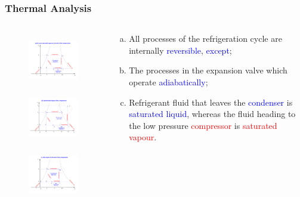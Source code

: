 \documentclass[10pt,compress]{beamer}
\begin{document}
\begin{frame}
 \frametitle{Thermal Analysis}
 \begin{columns}
  \begin{column}[c]{0.55\linewidth}
   \begin{figure}%
     \vbox{
      \includegraphics[width=4.cm,height=2.4cm,clip]{./Pics/Overview_Refrig14}
      \vspace{-.1cm}
      \includegraphics[width=4.cm,height=2.4cm,clip]{./Pics/Overview_Refrig15}
      \vspace{-.1cm}
      \includegraphics[width=4.cm,height=2.4cm,clip]{./Pics/Overview_Refrig16}}
   \end{figure}  
  \end{column}  
  \begin{column}[c]{0.45\linewidth}
   \begin{enumerate}[(a)]
    \item <1-> All processes of the refrigeration cycle are internally \textcolor{blue}{reversible}, \textcolor{blue}{except}; 
    \item <2-> The processes in the expansion valve which operate \textcolor{blue}{adiabatically};
    \item <3-> Refrigerant fluid that leaves the \textcolor{blue}{condenser} is \textcolor{blue}{saturated liquid}, whereas the fluid heading to the low pressure \textcolor{red}{compressor} is \textcolor{red}{saturated vapour}.
   \end{enumerate}
  \end{column}  
 \end{columns}
\end{frame}
\end{document}
